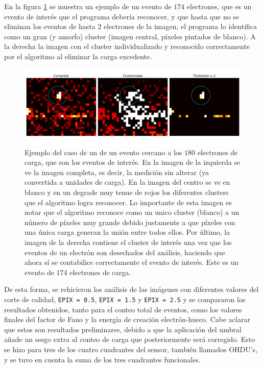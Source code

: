 \indent En la figura \ref{fig:ClusterPegoteado} se muestra un ejemplo de un evento de $174$ electrones, que es un evento de interés que el programa debería reconocer, y que hasta que no se eliminan los eventos de hasta $2$ electrones de la imagen, el programa lo identifica como un gran (y amorfo) cluster (imagen central, píxeles pintados de blanco). A la derecha la imagen con el cluster individualizado y reconocido correctamente por el algoritmo al eliminar la carga excedente.
\begin{figure}[H]
    \centering
    \includegraphics[scale=0.4]{Figs/despegoteo_clusters.pdf}
    \caption{\footnotesize{Ejemplo del caso de un de un evento cercano a los $180$ electrones de carga, que son los eventos de interés. En la imagen de la izquierda se ve la imagen completa, es decir, la medición sin alterar (ya convertida a unidades de carga). En la imagen del centro se ve en blanco y en un degrade muy tenue de rojos los diferentes clusters que el algoritmo logra reconocer. Lo importante de esta imagen es notar que el algoritmo reconoce como un unico cluster (blanco) a un número de píxeles muy grande debido justamente a que píxeles con una única carga generan la unión entre todos ellos. Por último, la imagen de la derecha contiene el cluster de interés una vez que los eventos de un electrón son desechados del análisis, haciendo que ahora sí se contabilice correctamente el evento de interés. Este es un evento de $174$ electrones de carga.}}
    \label{fig:ClusterPegoteado}
\end{figure}
De esta forma, se rehicieron los análisis de las imágenes con diferentes valores del corte de calidad, \verb|EPIX = 0.5|, \verb|EPIX = 1.5| y \verb|EPIX = 2.5| y se compararon los resultados obtenidos, tanto para el conteo total de eventos, como los valores finales del factor de Fano y la energía de creación electrón-hueco. Cabe aclarar que estos son resultados preliminares, debido a que la aplicación del umbral añade un sesgo extra al conteo de carga que posteriormente será corregido. Esto se hizo para tres de los cuatro cuadrantes del sensor, también llamados OHDU's, y se tuvo en cuenta la suma de los tres cuadrantes funcionales.\\
